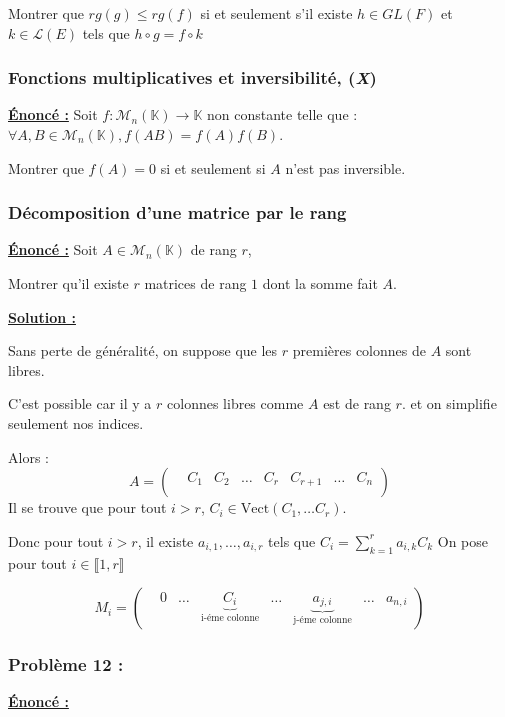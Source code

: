 Montrer que $rg(g)\leq rg(f)$ si et seulement s'il existe 
$h \in GL(F)$ et $k \in \mathcal{L}(E)$ tels que $h \circ g = f \circ k$

\subsubsection{Fonctions multiplicatives et inversibilité, (\textit{X})}
\textbf{\underline{Énoncé :}} 
Soit $f \colon \mathcal{M}_n(\mathbb{K})\rightarrow \mathbb{K}$ non constante 
telle que : $\forall A,B \in \mathcal{M}_n(\mathbb{K}), f(AB)=f(A)f(B)$.

Montrer que $f(A)=0$ si et seulement si $A$ n'est pas inversible.
\newpage

\subsubsection{Décomposition d'une matrice par le rang}
\textbf{\underline{Énoncé :}} 
Soit $A \in \mathcal{M}_n(\mathbb{K})$ de rang $r$, 

Montrer qu'il existe $r$ matrices de rang $1$ dont 
la somme fait $A$.      

\textbf{\underline{Solution :}}

Sans perte de généralité, on suppose que les $r$ premières colonnes de $A$ sont libres. 

C'est possible car il y a $r$ colonnes libres comme $A$ est de rang $r$. 
et on simplifie seulement nos indices. 

Alors : $$A = 
\begin{pmatrix} 
 &C_1 &C_2 &\dots &C_r & C_{r+1} &\dots&C_n \\ 
\end{pmatrix}
$$
Il se trouve que pour tout $i> r$, $C_i \in \text{Vect}(C_1,\dots C_r)$.

Donc pour tout $i > r$, il existe $a_{i,1},\dots,a_{i,r}$ tels que 
$\displaystyle C_i = \sum_{k=1}^{r}a_{i,k}C_k $
On pose pour tout $i \in \llbracket 1,r \rrbracket$

$$ M_i = \begin{pmatrix} &0&\dots&\underbrace{C_i}_{\text{i-éme colonne}} &\dots &\underbrace{a_{j,i}}_{\text{j-éme colonne}} &\dots &a_{n,i}\end{pmatrix}$$


\subsubsection{Problème 12 :}
\textbf{\underline{Énoncé :}} 

